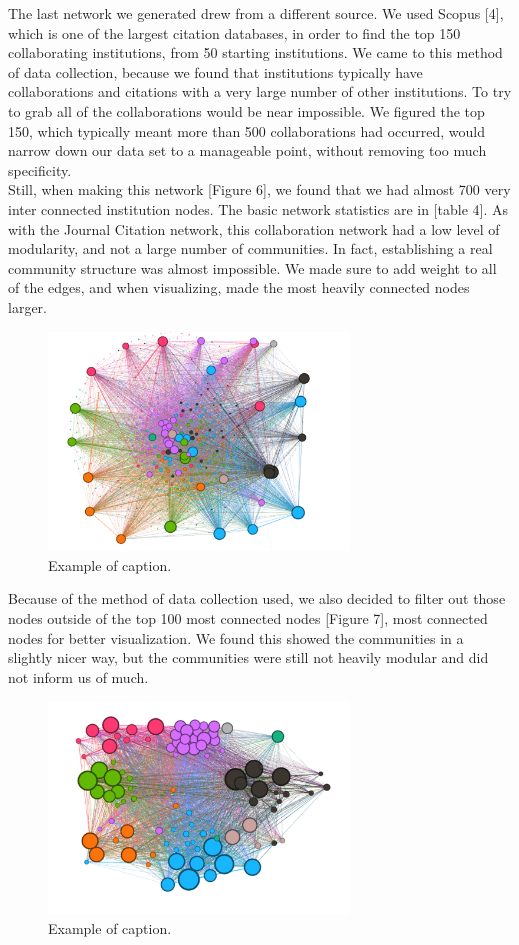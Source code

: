 \documentclass[times, 10pt,twocolumn]{article}
\begin{document}
The last network we generated drew from a different source. We used Scopus [4], which is one of the largest citation databases, in order to find the top 150 collaborating institutions, from 50 starting institutions. We came to this method of data collection, because we found that institutions typically have collaborations and citations with a very large number of other institutions. To try to grab all of the collaborations would be near impossible. We figured the top 150, which typically meant more than 500 collaborations had occurred, would narrow down our data set to a manageable point, without removing too much specificity. \\

Still, when making this network [Figure 6], we found that we had almost 700 very inter connected institution nodes. The basic network statistics are in [table 4]. As with the Journal Citation network, this collaboration network had a low level of modularity, and not a large number of communities. In fact, establishing a real community structure was almost impossible. We made sure to add weight to all of the edges, and when visualizing, made the most heavily connected nodes larger. \\

\begin{figure}[h]
   \includegraphics[width=8cm]{figure6.png}
   \caption{Example of caption.}
\end{figure}

Because of the method of data collection used, we also decided to filter out those nodes outside of the top 100 most connected nodes [Figure 7], most connected nodes for better visualization.  We found this showed the communities in a slightly nicer way, but the communities were still not heavily modular and did not inform us of much.    \\

\begin{figure}[h]
   \includegraphics[width=8cm]{figure7.png}
   \caption{Example of caption.}
\end{figure}
\end{document}
